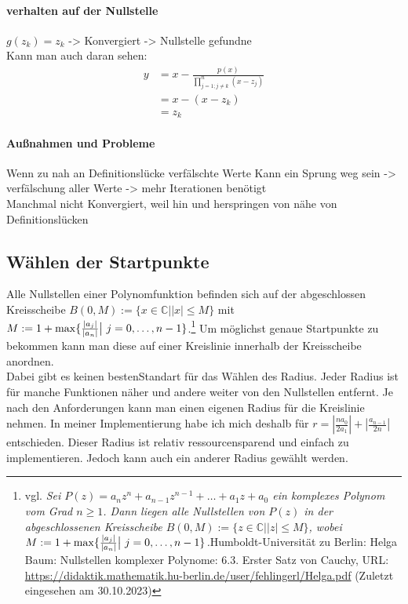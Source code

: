 \documentclass[12pt]{article}
\begin{document}
\paragraph{verhalten auf der Nullstelle}
$g(z_k) = z_k$ -> Konvergiert -> Nullstelle gefundne
\\
Kann man auch daran sehen:
\begin{align*}
    y &= x - \frac{p(x)}{\prod_{j=1;j\neq k}^{n} (x-z_j)} \\
    &= x - (x-z_k) \\
    &= z_k
\end{align*}
\paragraph{Außnahmen und Probleme}
Wenn zu nah an Definitionslücke verfälschte Werte
Kann ein Sprung weg sein -> verfälschung aller Werte -> mehr Iterationen benötigt
\\
Manchmal nicht Konvergiert, weil hin und herspringen von nähe von Definitionslücken

\subsection{Wählen der Startpunkte}
Alle Nullstellen einer Polynomfunktion befinden sich auf der abgeschlossen Kreisscheibe  $B(0,M) := \{x \in \mathbb{C} \bigr| |x| \le M\}$ mit $M := 1 + \max\{\frac{|a_j|}{|a_n|}\bigr|\text{\space}j=0,\dots,n-1\}$.\footnote{vgl. \glqq\textit{Sei $P(z) = a_nz^n+a_{n-1}z^{n-1}+\dots+a_1z+a_0$ ein komplexes Polynom vom Grad $n \ge 1$. Dann liegen alle Nullstellen von $P(z)$ in der abgeschlossenen Kreisscheibe $B(0,M) := \{z \in \mathbb{C} \bigr| |z| \le M\}$, wobei $M := 1 + \max\{\frac{|a_j|}{|a_n|}\bigr|\text{\space}j=0,\dots,n-1\}$.}\grqq\space Humboldt-Universität zu Berlin: Helga Baum: Nullstellen komplexer Polynome: 6.3. Erster Satz von Cauchy, URL: \url{https://didaktik.mathematik.hu-berlin.de/user/fehlingerl/Helga.pdf} (Zuletzt eingesehen am 30.10.2023)}  Um möglichst genaue Startpunkte zu bekommen kann man diese auf einer Kreislinie innerhalb der Kreisscheibe anordnen. \\
Dabei gibt es keinen \glqq besten\grqq\space Standart für das Wählen des Radius. Jeder Radius ist für manche Funktionen näher und andere weiter von den Nullstellen entfernt. Je nach den Anforderungen kann man einen eigenen Radius für die Kreislinie nehmen. In meiner Implementierung habe ich mich deshalb für $r = |\frac{na_0}{2a_1}| + |\frac{a_{n-1}}{2n}|$ entschieden.
Dieser Radius ist relativ ressourcensparend und einfach zu implementieren. Jedoch kann auch ein anderer Radius gewählt werden.
\end{document}
